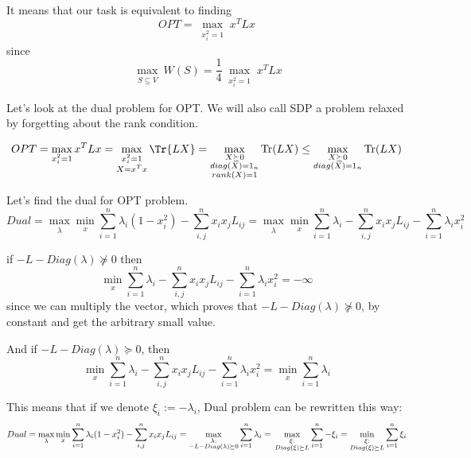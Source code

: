 \documentclass{article}
\DeclareMathOperator{\tr}{Tr}
\begin{document}
It means that our task is equivalent to finding $$OPT = \max_{\substack{x_i^2 = 1}} x^T L x$$ since $$\max_{\substack{S \subseteq V}} W(S) = \frac{1}{4} \max_{\substack{x_i^2 = 1}} x^T L x$$

Let's look at the dual problem for OPT. We will also call SDP a problem relaxed by forgetting about the rank condition.

$$OPT = \max_{\substack{x_i^2 = 1}} x^T L x = \max_{\substack{x_i^2 = 1 \\ X = x^T x}} \Tr{LX} = \max_{\substack{X \succeq 0 \\ diag(X) = 1_n \\ rank(X) = 1}} \tr (L X) \leq \max_{\substack{X \succeq 0 \\ diag(X) = 1_n}} \tr (L X)$$

Let's find the dual for OPT problem. 
$$Dual = \max_{\substack{\lambda}} \min_{\substack{x}} \sum_{i=1}^n{\lambda_i (1  - x_{i}^2)} - \sum_{i, j}^n{x_{i}x_{j} L_{ij}} = \max_{\substack{\lambda}} \min_{\substack{x}} \sum_{i=1}^n{\lambda_i} - \sum_{i, j}^n{x_{i}x_{j} L_{ij}} - \sum_{i=1}^n{\lambda_i x_{i}^2}$$

if $-L - Diag(\lambda) \not \succeq 0$ then $$\min_{\substack{x}}  \sum_{i=1}^n{\lambda_i} - \sum_{i, j}^n{x_{i}x_{j} L_{ij}} - \sum_{i=1}^n{\lambda_i x_{i}^2} = -\infty$$ since we can multiply the vector, which proves that $-L - Diag(\lambda) \not \succeq 0$, by constant and get the arbitrary small value. 

And if $-L - Diag(\lambda) \succeq 0$, then  $$\min_{\substack{x}}  \sum_{i=1}^n{\lambda_i} - \sum_{i, j}^n{x_{i}x_{j} L_{ij}} - \sum_{i=1}^n{\lambda_i x_{i}^2} = \min_{\substack{x}} \sum_{i=1}^n{\lambda_i}$$

This means that if we denote $\xi_i := -\lambda_i$, Dual problem can be rewritten this way: $$Dual = \max_{\substack{\lambda}} \min_{\substack{x}} \sum_{i=1}^n{\lambda_i (1  - x_{i}^2)} - \sum_{i, j}^n{x_{i}x_{j} L_{ij}} = \max_{\substack{\lambda: \\ -L - Diag(\lambda) \succeq 0}} \sum_{i=1}^n{\lambda_i} = \\ \max_{\substack{\xi: \\  Diag(\xi) \succeq L}} \sum_{i=1}^n{-\xi_i} =  \min_{\substack{\xi: \\  Diag(\xi) \succeq L}} \sum_{i=1}^n{\xi_i}$$
\end{document}
